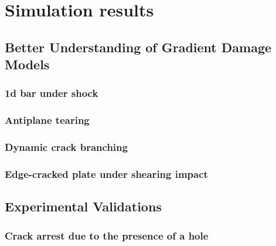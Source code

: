 \chapter{Simulation results}
\minitoc

\section{Better Understanding of Gradient Damage Models}

\subsection{1d bar under shock}

\subsection{Antiplane tearing} \label{sec:antiplane}

\subsection{Dynamic crack branching}

\subsection{Edge-cracked plate under shearing impact} \label{sec:kalthoff}

\section{Experimental Validations}

\subsection{Crack arrest due to the presence of a hole}

